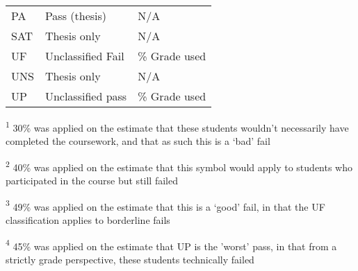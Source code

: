 \begin{table}[H]
\begin{threeparttable}
\begin{tabularx}{\textwidth}{>{\hsize=0.6\hsize}X>{\hsize=1.3\hsize}X>{\hsize=1.1\hsize}X}
            PA             & Pass (thesis)            & N/A                                        \\
            SAT            & Thesis only              & N/A                                        \\
            UF             & Unclassified Fail        & 49\% Grade used\tnote{\textsuperscript{3}} \\
            UNS            & Thesis only              & N/A                                        \\
            UP             & Unclassified pass        & 45\% Grade used\tnote{\textsuperscript{4}} \\
            \bottomrule
        \end{tabularx}
        \scriptsize
        \begin{tablenotes}
            \item[\textsuperscript{1}]30\% was applied on the estimate that these students wouldn't necessarily have completed the coursework, and that as such this is a `bad' fail
            \item[\textsuperscript{2}]40\% was applied on the estimate that this symbol would apply to students who participated in the course but still failed
            \item[\textsuperscript{3}]49\% was applied on the estimate that this is a `good' fail, in that the UF classification applies to borderline fails
            \item[\textsuperscript{4}]45\% was applied on the estimate that UP is the 'worst' pass, in that from a strictly grade perspective, these students technically failed
        \end{tablenotes}
    \end{threeparttable}
\end{table}